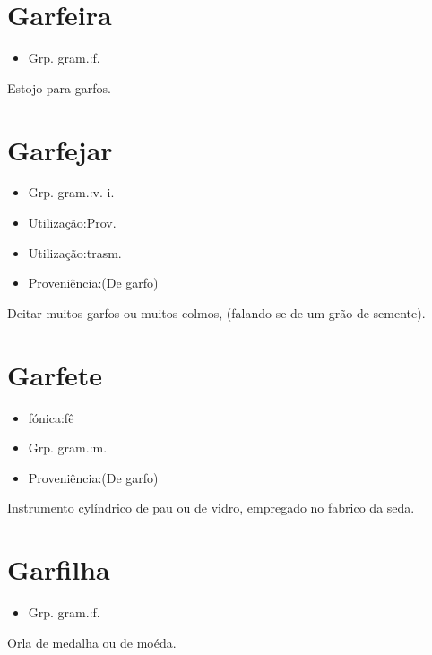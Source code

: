 \section{Garfeira}
\begin{itemize}
\item {Grp. gram.:f.}
\end{itemize}
Estojo para garfos.
\section{Garfejar}
\begin{itemize}
\item {Grp. gram.:v. i.}
\end{itemize}
\begin{itemize}
\item {Utilização:Prov.}
\end{itemize}
\begin{itemize}
\item {Utilização:trasm.}
\end{itemize}
\begin{itemize}
\item {Proveniência:(De \textunderscore garfo\textunderscore )}
\end{itemize}
Deitar muitos garfos ou muitos colmos, (falando-se de um grão de semente).
\section{Garfete}
\begin{itemize}
\item {fónica:fê}
\end{itemize}
\begin{itemize}
\item {Grp. gram.:m.}
\end{itemize}
\begin{itemize}
\item {Proveniência:(De \textunderscore garfo\textunderscore )}
\end{itemize}
Instrumento cylíndrico de pau ou de vidro, empregado no fabrico da seda.
\section{Garfilha}
\begin{itemize}
\item {Grp. gram.:f.}
\end{itemize}
Orla de medalha ou de moéda.
